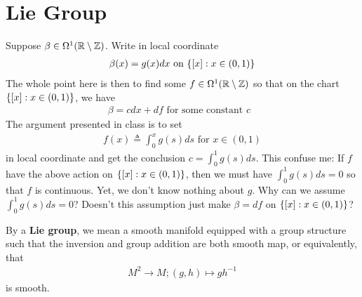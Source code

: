 \documentclass{report}
\begin{document}
\section{Lie Group}
\begin{mdframed}
Suppose $\beta  \in \Omega^1 (\mathbb{R} \setminus \mathbb{Z})$. Write in local coordinate 
\begin{align*}
\beta  (x)=g(x)dx\text{ on }\{ [x]:x \in (0,1) \}
\end{align*}
The whole point here is then to find some $f \in \Omega^1 (\mathbb{R} \setminus \mathbb{Z})$ so that on the chart $\{ [x]: x \in (0,1) \}$, we have 
\begin{align*}
\beta = cdx + df\text{ for some constant $c$ }
\end{align*}
The argument presented in class is to set  
\begin{align*}
f(x)\triangleq \int_0^x g(s)ds\text{ for }x\in (0,1)
\end{align*}
in local coordinate and get the conclusion $c= \int_0^1 g(s)ds$. This confuse me: If $f$ have the above action on  $\{ [x]:x \in (0,1) \}$, then we must have $\int_0^1 g(s)ds=0$ so that $f$ is continuous. Yet, we don't know nothing about $g$. Why can we assume $\int_0^1 g(s)ds=0$? Doesn't this assumption just make $\beta =df$ on $\{ [x]: x\in (0,1) \}$?  
\end{mdframed}
\begin{mdframed}
By a \textbf{Lie group}, we mean a smooth manifold equipped with a group structure such that the inversion and group addition are both smooth map, or equivalently, that 
\begin{align*}
M^2\rightarrow  M; (g,h)\mapsto gh^{-1}
\end{align*}
is smooth. 
\end{mdframed}
\end{document}
